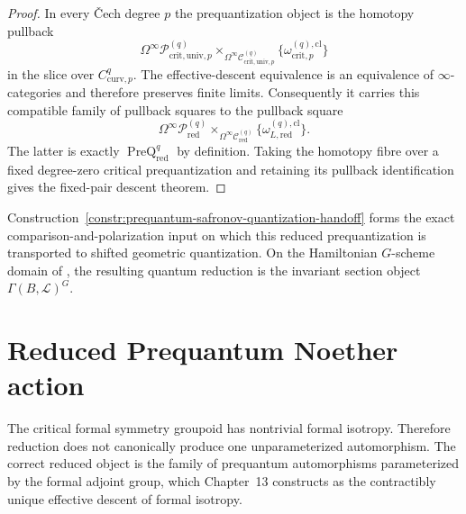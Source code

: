 \begin{proof}
In every \v{C}ech degree $p$ the prequantization object is the homotopy pullback
\[
\Omega^\infty\mathscr P_{\mathrm{crit,univ},p}^{(q)}
\times_{\Omega^\infty\mathscr C_{\mathrm{crit,univ},p}^{(q)}}
\{\omega_{\mathrm{crit},p}^{(q),\mathrm{cl}}\}
\]
in the slice over $C_{\mathrm{curv},p}^q$.  The effective-descent equivalence is an
equivalence of $\infty$-categories and therefore preserves finite limits.
Consequently it carries this compatible family of pullback squares to the
pullback square
\[
\Omega^\infty\mathscr P_{\mathrm{red}}^{(q)}
\times_{\Omega^\infty\mathscr C_{\mathrm{red}}^{(q)}}
\{\omega_{L,\mathrm{red}}^{(q),\mathrm{cl}}\}.
\]
The latter is exactly
$\operatorname{PreQ}_{\mathrm{red}}^q$ by definition.  Taking the homotopy fibre
over a fixed degree-zero critical prequantization and retaining its pullback
identification gives the fixed-pair descent theorem.
\end{proof}

Construction~\ref{constr:prequantum-safronov-quantization-handoff} forms the
exact comparison-and-polarization input on which this reduced prequantization is
transported to shifted geometric quantization.  On the Hamiltonian $G$-scheme
domain of \cite[Proposition~4.13]{Safronov2020}, the resulting quantum reduction
is the invariant section object $\Gamma(B,\mathcal L)^G$.

\section{Reduced Prequantum Noether action}
\label{sec:prequantum-reduced-noether-automorphisms}

The critical formal symmetry groupoid has nontrivial formal isotropy.  Therefore
reduction does not canonically produce one unparameterized automorphism.  The
correct reduced object is the family of prequantum automorphisms parameterized
by the formal adjoint group, which Chapter~13 constructs as the contractibly
unique effective descent of formal isotropy.

